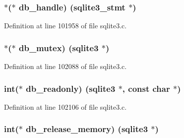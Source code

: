 \subsubsection[{db\+\_\+handle}]{$\ast$($\ast$ db\+\_\+handle) ({\bf sqlite3\+\_\+stmt} $\ast$)}\label{structsqlite3__api__routines_aac07d5898204bc18ddf5b45cc52c3062}


Definition at line 101958 of file sqlite3.\+c.

\hypertarget{structsqlite3__api__routines_a5128f423679ab47a44f61c026d53c3f2}{}
\subsubsection[{db\+\_\+mutex}]{$\ast$($\ast$ db\+\_\+mutex) ({\bf sqlite3} $\ast$)}\label{structsqlite3__api__routines_a5128f423679ab47a44f61c026d53c3f2}


Definition at line 102088 of file sqlite3.\+c.

\hypertarget{structsqlite3__api__routines_a2a04c7c12414aa6d7e03cc56d29ded8d}{}
\subsubsection[{db\+\_\+readonly}]{\setlength{\rightskip}{0pt plus 5cm}int($\ast$ db\+\_\+readonly) ({\bf sqlite3} $\ast$, const char $\ast$)}\label{structsqlite3__api__routines_a2a04c7c12414aa6d7e03cc56d29ded8d}


Definition at line 102106 of file sqlite3.\+c.

\hypertarget{structsqlite3__api__routines_aebcaae009deec2da0f62049e41748aad}{}
\subsubsection[{db\+\_\+release\+\_\+memory}]{\setlength{\rightskip}{0pt plus 5cm}int($\ast$ db\+\_\+release\+\_\+memory) ({\bf sqlite3} $\ast$)}\label{structsqlite3__api__routines_aebcaae009deec2da0f62049e41748aad}


